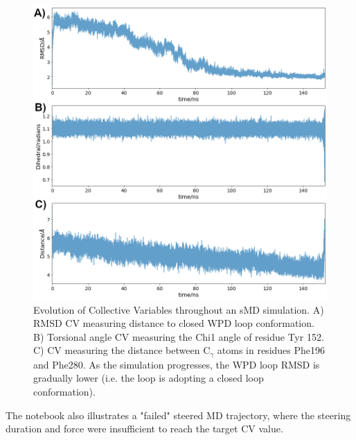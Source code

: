\begin{figure}[htp]
    \centering
    \includegraphics[width=\linewidth]{LIVECOMS/03_steered_md/COLVAR_all.png}
    \caption{Evolution of Collective Variables throughout an sMD simulation. A) RMSD CV measuring distance to closed WPD loop conformation. B) Torsional angle CV measuring the Chi1 angle of residue Tyr 152. C)  CV measuring the distance between C$_{\gamma}$ atoms in residues Phe196 and Phe280. As the simulation progresses, the WPD loop RMSD is gradually lower (i.e. the loop is adopting a  closed loop conformation).}
    \label{fig:rmsd}
\end{figure}

The notebook also illustrates a "failed" steered MD trajectory, where the steering duration and force were insufficient to reach the target CV value.

